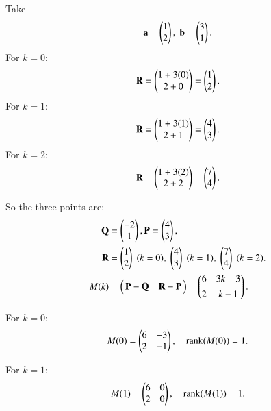 \documentclass[journal]{article}
\begin{document}
Take 
\begin{align}
\mathbf{a}=\begin{pmatrix}1 \\ 2\end{pmatrix},\; \mathbf{b}=\begin{pmatrix}3 \\ 1\end{pmatrix}.
\end{align}
For $k=0$:
\begin{align}
\mathbf{R} = \begin{pmatrix}1+3(0) \\ 2+0\end{pmatrix} = \begin{pmatrix}1 \\ 2\end{pmatrix}.
\end{align}
For $k=1$:
\begin{align}
\mathbf{R} = \begin{pmatrix}1+3(1) \\ 2+1\end{pmatrix} = \begin{pmatrix}4 \\ 3\end{pmatrix}.
\end{align}
For $k=2$:
\begin{align}
\mathbf{R} = \begin{pmatrix}1+3(2) \\ 2+2\end{pmatrix} = \begin{pmatrix}7 \\ 4\end{pmatrix}.
\end{align}

So the three points are:
\begin{align}
\mathbf{Q} &= \begin{pmatrix}-2 \\ 1\end{pmatrix}, 
\mathbf{P} = \begin{pmatrix}4 \\ 3\end{pmatrix}, \\
\mathbf{R} &= \begin{pmatrix}1 \\ 2\end{pmatrix}\;(k=0),\; \begin{pmatrix}4 \\ 3\end{pmatrix}\;(k=1),\; \begin{pmatrix}7 \\ 4\end{pmatrix}\;(k=2).\\
M(k) &= \begin{pmatrix}\,\mathbf{P}-\mathbf{Q} & \mathbf{R}-\mathbf{P}\,\end{pmatrix} 
     = \begin{pmatrix}6 & 3k-3 \\[4pt] 2 & k-1\end{pmatrix}.
\end{align}

For $k=0$:
\begin{align}
M(0) = \begin{pmatrix}6 & -3 \\ 2 & -1\end{pmatrix}, \quad \text{rank}(M(0))=1.
\end{align}

For $k=1$:
\begin{align}
M(1) = \begin{pmatrix}6 & 0 \\ 2 & 0\end{pmatrix}, \quad \text{rank}(M(1))=1.
\end{align}
\end{document}
